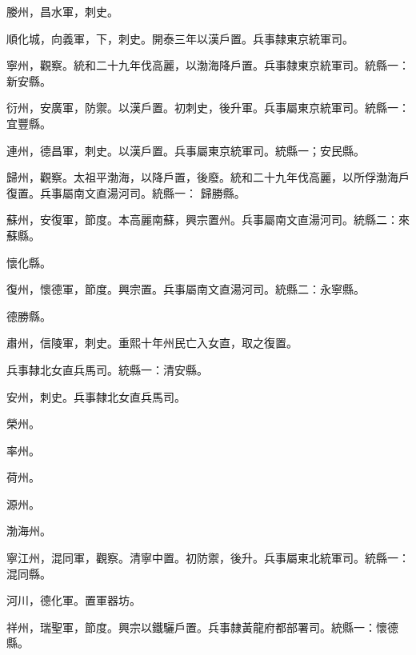 \begin{pinyinscope}
 媵州，昌水軍，刺史。



 順化城，向義軍，下，刺史。開泰三年以漢戶置。兵事隸東京統軍司。



 寧州，觀察。統和二十九年伐高麗，以渤海降戶置。兵事隸東京統軍司。統縣一：
 新安縣。



 衍州，安廣軍，防禦。以漢戶置。初刺史，後升軍。兵事屬東京統軍司。統縣一：宜豐縣。



 連州，德昌軍，刺史。以漢戶置。兵事屬東京統軍司。統縣一；安民縣。



 歸州，觀察。太祖平渤海，以降戶置，後廢。統和二十九年伐高麗，以所俘渤海戶復置。兵事屬南文直湯河司。統縣一：
 歸勝縣。



 蘇州，安復軍，節度。本高麗南蘇，興宗置州。兵事屬南文直湯河司。統縣二：來蘇縣。



 懷化縣。



 復州，懷德軍，節度。興宗置。兵事屬南文直湯河司。統縣二：永寧縣。



 德勝縣。



 肅州，信陵軍，刺史。重熙十年州民亡入女直，取之復置。



 兵事隸北女直兵馬司。統縣一：清安縣。



 安州，刺史。兵事隸北女直兵馬司。



 榮州。



 率州。



 荷州。



 源州。



 渤海州。



 寧江州，混同軍，觀察。清寧中置。初防禦，後升。兵事屬東北統軍司。統縣一：
 混同縣。



 河川，德化軍。置軍器坊。



 祥州，瑞聖軍，節度。興宗以鐵驪戶置。兵事隸黃龍府都部署司。統縣一：懷德縣。



\end{pinyinscope}